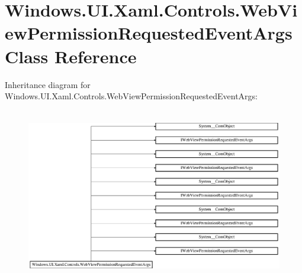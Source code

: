 \hypertarget{class_windows_1_1_u_i_1_1_xaml_1_1_controls_1_1_web_view_permission_requested_event_args}{}\section{Windows.\+U\+I.\+Xaml.\+Controls.\+Web\+View\+Permission\+Requested\+Event\+Args Class Reference}
\label{class_windows_1_1_u_i_1_1_xaml_1_1_controls_1_1_web_view_permission_requested_event_args}
Inheritance diagram for Windows.\+U\+I.\+Xaml.\+Controls.\+Web\+View\+Permission\+Requested\+Event\+Args\+:\begin{figure}[H]
\begin{center}
\leavevmode
\includegraphics[height=7.642680cm]{class_windows_1_1_u_i_1_1_xaml_1_1_controls_1_1_web_view_permission_requested_event_args}
\end{center}
\end{figure}
